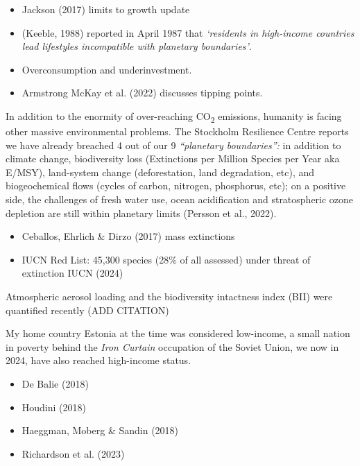 \documentclass[
  letterpaper,
  DIV=11,
  numbers=noendperiod]{scrartcl}
\providecommand{\tightlist}{%
  \setlength{\itemsep}{0pt}\setlength{\parskip}{0pt}}\usepackage{longtable,booktabs,array}
\begin{document}
\begin{itemize}
\tightlist
\item
  Jackson (2017) limits to growth update
\item
  (Keeble, 1988) reported in April 1987 that \emph{`residents in
  high-income countries lead lifestyles incompatible with planetary
  boundaries'}.
\item
  Overconsumption and underinvestment.
\end{itemize}

\begin{itemize}
\tightlist
\item
  Armstrong McKay et al. (2022) discusses tipping points.
\end{itemize}

In addition to the enormity of over-reaching CO\textsubscript{2}
emissions, humanity is facing other massive environmental problems. The
Stockholm Resilience Centre reports we have already breached 4 out of
our 9 \emph{``planetary boundaries'':} in addition to climate change,
biodiversity loss (Extinctions per Million Species per Year aka E/MSY),
land-system change (deforestation, land degradation, etc), and
biogeochemical flows (cycles of carbon, nitrogen, phosphorus, etc); on a
positive side, the challenges of fresh water use, ocean acidification
and stratospheric ozone depletion are still within planetary limits
(Persson et al., 2022).

\begin{itemize}
\tightlist
\item
  Ceballos, Ehrlich \& Dirzo (2017) mass extinctions
\item
  IUCN Red List: 45,300 species (28\% of all assessed) under threat of
  extinction IUCN (2024)
\end{itemize}

Atmospheric aerosol loading and the biodiversity intactness index (BII)
were quantified recently (ADD CITATION)

My home country Estonia at the time was considered low-income, a small
nation in poverty behind the \emph{Iron Curtain} occupation of the
Soviet Union, we now in 2024, have also reached high-income status.

\begin{itemize}
\item
  De Balie (2018)
\item
  Houdini (2018)
\item
  Haeggman, Moberg \& Sandin (2018)
\item
  Richardson et al. (2023)
\end{itemize}
\end{document}
